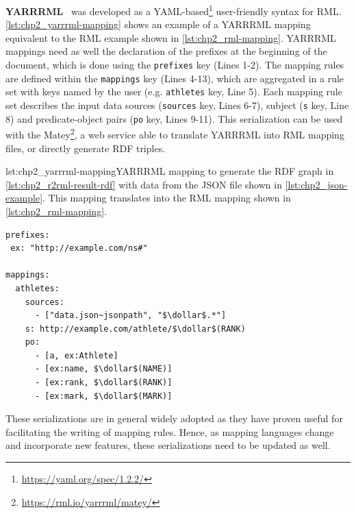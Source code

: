 \textbf{YARRRML}~\parencite{Heyvaert2018yarrrml} was developed as a YAML-based\footnote{\url{https://yaml.org/spec/1.2.2/}} user-friendly syntax for RML. 
\cref{lst:chp2_yarrrml-mapping} shows an example of a YARRRML mapping equivalent to the RML example shown in \cref{lst:chp2_rml-mapping}. 
YARRRML mappings need as well the declaration of the prefixes at the beginning of the document, which is done using the \texttt{prefixes} key (Lines 1-2). The mapping rules are defined within the \texttt{mappings} key (Lines 4-13), which are aggregated in a rule set with keys named by the user (e.g. \texttt{athletes} key, Line 5). Each mapping rule set describes the input data sources (\texttt{sources} key, Lines 6-7), subject (\texttt{s} key, Line 8) and predicate-object pairs (\texttt{po} key, Lines 9-11).
This serialization can be used with the Matey\footnote{\url{https://rml.io/yarrrml/matey/}}, a web service able to translate YARRRML into RML mapping files, or directly generate RDF triples. 

\begin{captionedlisting}{lst:chp2_yarrrml-mapping}{YARRRML mapping to generate the RDF graph in \cref{lst:chp2_r2rml-result-rdf} with data from the JSON file shown in \cref{lst:chp2_json-example}. This mapping translates into the RML mapping shown in \cref{lst:chp2_rml-mapping}.}
\centering
{\begin{lstlisting}[language=yarrrml]
prefixes:
 ex: "http://example.com/ns#"

mappings:
  athletes:
    sources:
      - ["data.json~jsonpath", "$\dollar$.*"]
    s: http://example.com/athlete/$\dollar$(RANK)
    po:
      - [a, ex:Athlete]
      - [ex:name, $\dollar$(NAME)]
      - [ex:rank, $\dollar$(RANK)]
      - [ex:mark, $\dollar$(MARK)]
\end{lstlisting}}
\end{captionedlisting}

These serializations are in general widely adopted as they have proven useful for facilitating the writing of mapping rules. Hence, as mapping languages change and incorporate new features, these serializations need to be updated as well.